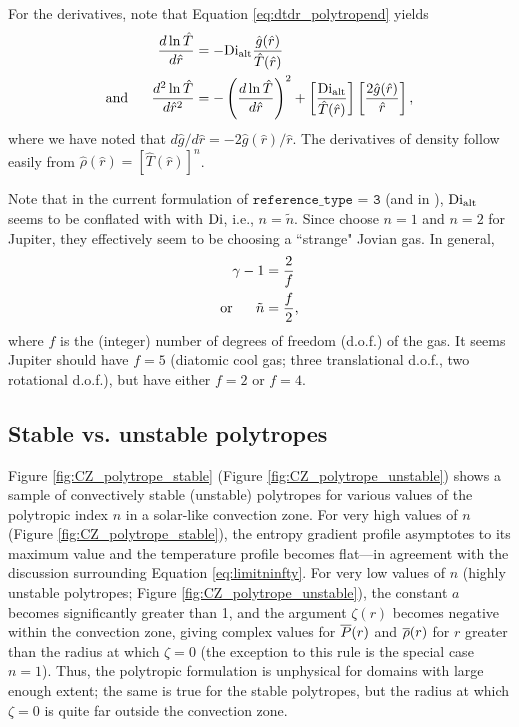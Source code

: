 \documentclass[12pt]{article}
\numberwithin{equation}{section}
\newcommand{\dialt}{\di_{\rm{alt}}}
\begin{document}
For the derivatives, note that Equation \eqref{eq:dtdr_polytropend} yields
\begin{align}
	\frac{d\ln\hat{T}}{d\hat{r}} &= -\dialt \frac{\hat{g}(\hat{r})}{\hat{T}(\hat{r})}\\
	\andd \frac{d^2\ln\hat{T}}{d\hat{r}^2} &= -\left(\frac{d\ln\hat{T}}{d\hat{r}}\right)^2 + \left[\frac{\dialt}{\hat{T}(\hat{r})}\right] \left[\frac{2\hat{g}(\hat{r})}{\hat{r}} \right],
\end{align}
where we have noted that $d\hat{g}/d\hat{r}=-2\hat{g}(\hat{r})/\hat{r}$. The derivatives of density follow easily from $\hat{\rho}(\hat{r})=[\hat{T}(\hat{r})]^n$.

Note that in the current formulation of $\texttt{reference\_type = 3}$ (and in \citealt{Heimpel2022}), $\dialt$ seems to be conflated with with ${\rm{Di}}$, i.e., $n = \tilde{n}$. Since \citet{Heimpel2022} choose $n=1$ and $n=2$ for Jupiter, they effectively seem to be choosing a ``strange" Jovian gas. In general, 
\begin{subequations}
\begin{align}
	\gamma - 1 &= \frac{2}{f}\\
	\text{or}\ \ \ \ \  \tilde{n} &= \frac{f}{2},
\end{align}
\end{subequations}
where $f$ is the (integer) number of degrees of freedom (d.o.f.) of the gas. It seems Jupiter should have $f=5$ (diatomic cool gas; three translational d.o.f., two rotational d.o.f.), but \citet{Heimpel2022} have either $f=2$ or $f=4$. 

\subsection{Stable vs. unstable polytropes}
Figure \ref{fig:CZ_polytrope_stable} (Figure \ref{fig:CZ_polytrope_unstable}) shows a sample of convectively stable (unstable) polytropes for various values of the polytropic index $n$ in a solar-like convection zone. For very high values of $n$ (Figure \ref{fig:CZ_polytrope_stable}), the entropy gradient profile asymptotes to its maximum value and the temperature profile becomes flat---in agreement with the discussion surrounding Equation \eqref{eq:limitninfty}. For very low values of $n$ (highly unstable polytropes; Figure \ref{fig:CZ_polytrope_unstable}), the constant $a$ becomes significantly greater than 1, and the argument $\zeta(r)$ becomes negative within the convection zone, giving complex values for $\overline{P}(r)$ and $\overline{\rho}(r)$ for $r$ greater than the radius at which $\zeta=0$ (the exception to this rule is the special case $n=1$). Thus, the polytropic formulation is unphysical for domains with large enough extent; the same is true for the stable polytropes, but the radius at which $\zeta=0$ is quite far outside the convection zone.
\end{document}
